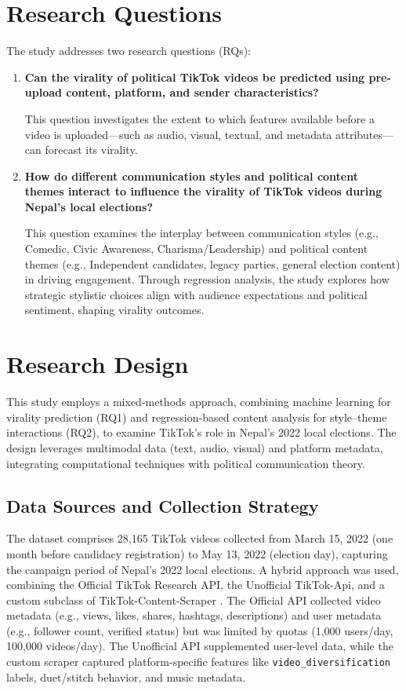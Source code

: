 \documentclass[12pt,a4paper]{report}
\begin{document}
\chapter{Research Questions}
\label{sec:research_questions}

The study addresses two research questions (RQs):

\begin{enumerate}[label=RQ\arabic*:, leftmargin=*]
    \item \textbf{Can the virality of political TikTok videos be predicted using pre-upload content, platform, and sender characteristics?}
    
    This question investigates the extent to which features available before a video is uploaded—such as audio, visual, textual, and metadata attributes—can forecast its virality. 

    \item \textbf{How do different communication styles and political content themes interact to influence the virality of TikTok videos during Nepal’s local elections?}
    
    This question examines the interplay between communication styles (e.g., Comedic, Civic Awareness, Charisma/Leadership) and political content themes (e.g., Independent candidates, legacy parties, general election content) in driving engagement. Through regression analysis, the study explores how strategic stylistic choices align with audience expectations and political sentiment, shaping virality outcomes. 
\end{enumerate}

\chapter{Research Design}
This study employs a mixed-methods approach, combining machine learning for virality prediction (RQ1) and regression-based content analysis for style–theme interactions (RQ2), to examine TikTok’s role in Nepal’s 2022 local elections. The design leverages multimodal data (text, audio, visual) and platform metadata, integrating computational techniques with political communication theory.

\section{Data Sources and Collection Strategy}
The dataset comprises 28,165 TikTok videos collected from March 15, 2022 (one month before candidacy registration) to May 13, 2022 (election day), capturing the campaign period of Nepal’s 2022 local elections. A hybrid approach was used, combining the Official TikTok Research API, the Unofficial TikTok-Api, and a custom subclass of TikTok-Content-Scraper \parencite{QBukold2025TikTokScraper}. The Official API collected video metadata (e.g., views, likes, shares, hashtags, descriptions) and user metadata (e.g., follower count, verified status) but was limited by quotas (1,000 users/day, 100,000 videos/day). The Unofficial API supplemented user-level data, while the custom scraper captured platform-specific features like \texttt{video\_diversification} labels, duet/stitch behavior, and music metadata.
\end{document}
